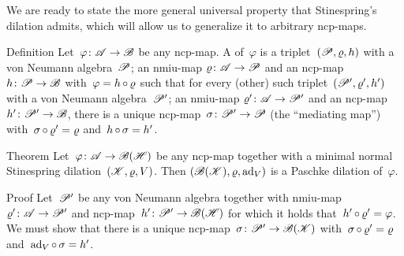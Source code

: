 \documentclass[b]{subfiles}
\begin{document}
\begin{parsec}%
\begin{point}%
    We are ready to state the more general universal property
        that Stinespring's dilation admits,
        which will allow us to generalize it to arbitrary ncp-maps.
\end{point}
\begin{point}{Definition}%
    Let~$\varphi\colon \mathscr{A} \to \mathscr{B}$
        be any ncp-map.
    A  of~$\varphi$
    is a triplet~$(\mathscr{P}, \varrho, h)$
    with a von Neumann algebra~$\mathscr{P}$;
    an nmiu-map $\varrho \colon \mathscr{A} \to \mathscr{P}$
    and an ncp-map~$h \colon \mathscr{P} \to \mathscr{B}$
    with~$\varphi = h \mathop{\circ} \varrho$
    such that for every (other)
    such triplet~$(\mathscr{P}', \varrho', h')$
    with a von Neumann algebra~$\mathscr{P}'$;
    an nmiu-map $\varrho'\colon \mathscr{A} \to \mathscr{P}'$
    and an ncp-map~$h' \colon \mathscr{P}' \to \mathscr{B}$,
    there is a unique ncp-map~$\sigma \colon \mathscr{P}' \to \mathscr{P}$
    (the ``mediating map'')
    with~$\sigma \mathop{\circ} \varrho' = \varrho$
    and~$h \mathop{\circ} \sigma = h'$.
    \par %
\end{point}
\begin{point}{Theorem}%
Let~$\varphi\colon \mathscr{A} \to \mathscr{B}(\mathscr{H})$
    be any ncp-map
    together with a minimal normal Stinespring dilation~$(\mathscr{K},\varrho,V)$.
    Then $(\mathscr{B}(\mathscr{K}), \varrho, \mathrm{ad}_V)$
        is a Paschke dilation of~$\varphi$.

\begin{point}{Proof}%
Let~$\mathscr{P}'$ be any von Neumann algebra
    together with nmiu-map~$\varrho'\colon \mathscr{A} \to \mathscr{P}'$
    and ncp-map~$h'\colon \mathscr{P}' \to \mathscr{B}(\mathscr{H})$
    for which it holds that~$h' \mathop{\circ} \varrho' = \varphi$.
We must show that there is a unique
    ncp-map~$\sigma\colon \mathscr{P}' \to \mathscr{B}(\mathscr{K})$
    with~$\sigma \mathop{\circ} \varrho' = \varrho$
    and~$\mathrm{ad}_V \mathop{\circ} \sigma = h'$.


\end{point}
\end{point}
\end{parsec}
\end{document}
